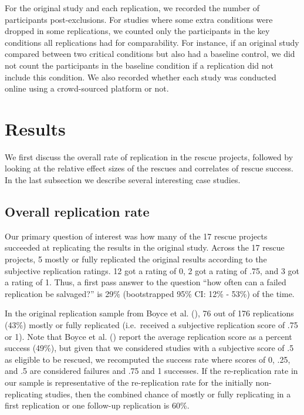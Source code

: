 \documentclass[
  english,
  a4paper,
]{article}
\begin{document}
For the original study and each replication, we recorded the number of participants post-exclusions.
For studies where some extra conditions were dropped in some replications, we counted only the participants in the key conditions all replications had for comparability.
For instance, if an original study compared between two critical conditions but also had a baseline control, we did not count the participants in the baseline condition if a replication did not include this condition.
We also recorded whether each study was conducted online using a crowd-sourced platform or not.

\section{Results}\label{results}

We first discuss the overall rate of replication in the rescue projects, followed by looking at the relative effect sizes of the rescues and correlates of rescue success.
In the last subsection we describe several interesting case studies.

\subsection{Overall replication rate}\label{overall-replication-rate}

Our primary question of interest was how many of the 17 rescue projects succeeded at replicating the results in the original study.
Across the 17 rescue projects, 5 mostly or fully replicated the original results according to the subjective replication ratings.
12 got a rating of 0, 2 got a rating of .75, and 3 got a rating of 1.
Thus, a first pass answer to the question ``how often can a failed replication be salvaged?'' is 29\% (bootstrapped 95\% CI: 12\% - 53\%) of the time.

In the original replication sample from Boyce et al. (), 76 out of 176 replications (43\%) mostly or fully replicated (i.e.~received a subjective replication score of .75 or 1).
Note that Boyce et al. () report the average replication score as a percent success (49\%), but given that we considered studies with a subjective score of .5 as eligible to be rescued, we recomputed the success rate where scores of 0, .25, and .5 are considered failures and .75 and 1 successes.
If the re-replication rate in our sample is representative of the re-replication rate for the initially non-replicating studies, then the combined chance of mostly or fully replicating in a first replication or one follow-up replication is 60\%.
\end{document}
